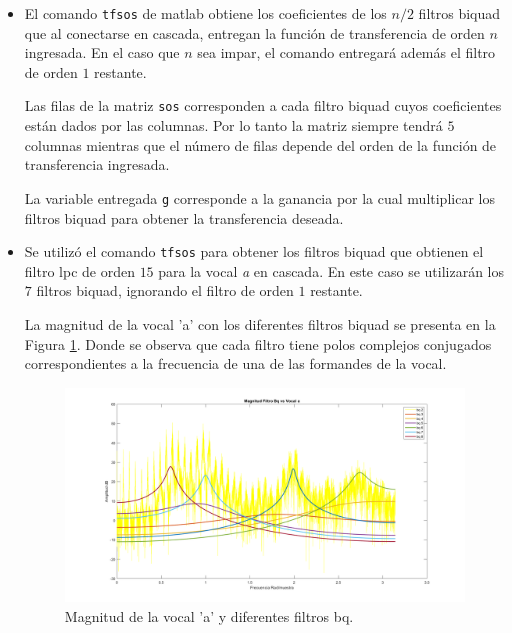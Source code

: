 \documentclass[letterpaper,onecolumn,10pt,journal,final]{IEEEtran}
\begin{document}
\begin{enumerate}[1)]
\begin{itemize}
    \item 
    El comando \texttt{tfsos} de matlab obtiene los coeficientes de los $n/2$ filtros biquad que al conectarse en cascada, entregan la función de transferencia de orden $n$ ingresada. En el caso que $n$ sea impar, el comando entregará además el filtro de orden $1$ restante.
    
    Las filas de la matriz \texttt{sos} corresponden a cada filtro biquad cuyos coeficientes están dados por las columnas. Por lo tanto la matriz siempre tendrá $5$ columnas mientras que el número de filas depende del orden de la función de transferencia ingresada.
    
    La variable entregada \texttt{g} corresponde a la ganancia por la cual multiplicar los filtros biquad para obtener la transferencia deseada. 
    \item
    Se utilizó el comando \texttt{tfsos} para obtener los filtros biquad que obtienen el filtro lpc de orden $15$ para la vocal \textit{a} en cascada. En este caso se utilizarán los $7$ filtros biquad, ignorando el filtro de orden $1$ restante.

    La magnitud de la vocal 'a' con los diferentes filtros biquad se presenta en la Figura \ref{P4_3}. Donde se observa que cada filtro tiene polos complejos conjugados correspondientes a la frecuencia de una de las formandes de la vocal.
%
\begin{figure}[H]
    \centering
    \includegraphics[width = 0.9 \linewidth]{Figuras/P4_3.png}
    \caption{Magnitud de la vocal 'a' y diferentes filtros bq.}
    \label{P4_3}
\end{figure}
\end{itemize}
\end{enumerate}
%
%
\end{document}
